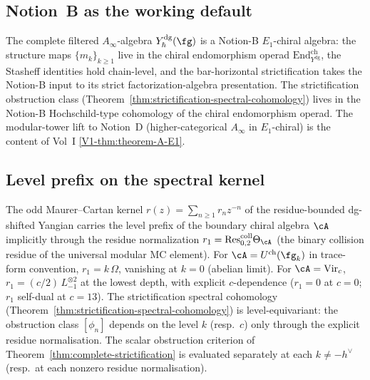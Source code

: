 \subsection{Notion~B as the working default}
\label{subsec:dg-shifted-bridge-working-notion}

\begin{convention}
\label{conv:dg-shifted-bridge-notion-b}
The complete filtered $A_\infty$-algebra $Y^{\mathrm{dg}}_\hbar(\fg)$
is a Notion-B $E_1$-chiral algebra: the structure maps
$\{m_k\}_{k\ge 1}$ live in the chiral endomorphism operad
$\mathrm{End}^{\mathrm{ch}}_{Y^{\mathrm{dg}}}$, the Stasheff
identities hold chain-level, and the bar-horizontal strictification
takes the Notion-B input to its strict factorization-algebra
presentation. The strictification obstruction class
(Theorem~\ref{thm:strictification-spectral-cohomology}) lives
in the Notion-B Hochschild-type cohomology of the chiral
endomorphism operad. The modular-tower lift to Notion~D
(higher-categorical $A_\infty$ in $E_1$-chiral) is the content of
Vol~I \cref{V1-thm:theorem-A-E1}.
\end{convention}

\subsection{Level prefix on the spectral kernel}
\label{subsec:dg-shifted-bridge-rmatrix-level-prefix}

\begin{remark}
\label{rem:dg-shifted-bridge-rmatrix-level-prefix}
The odd Maurer--Cartan kernel $r(z) = \sum_{n\ge 1}r_n z^{-n}$ of
the residue-bounded dg-shifted Yangian carries the level prefix
of the boundary chiral algebra $\cA$ implicitly through the
residue normalization $r_1 = \mathrm{Res}^{\mathrm{coll}}_{0,2}
\Theta_\cA$ (the binary collision residue of the universal
modular MC element). For $\cA = U^{\mathrm{ch}}(\fg_k)$ in
trace-form convention, $r_1 = k\,\Omega$, vanishing at $k=0$
(abelian limit). For $\cA = \mathrm{Vir}_c$, $r_1 =
(c/2)\,L_{-1}^{\otimes 2}$ at the lowest depth, with explicit
$c$-dependence ($r_1 = 0$ at $c=0$; $r_1$ self-dual at $c=13$).
The strictification spectral cohomology
(Theorem~\ref{thm:strictification-spectral-cohomology}) is
level-equivariant: the obstruction class $[\phi_n]$ depends on the
level $k$ (resp.\ $c$) only through the explicit residue
normalisation. The scalar obstruction criterion of
Theorem~\ref{thm:complete-strictification} is evaluated separately at
each $k\ne -h^\vee$ (resp.\ at each nonzero residue normalisation).
\end{remark}

